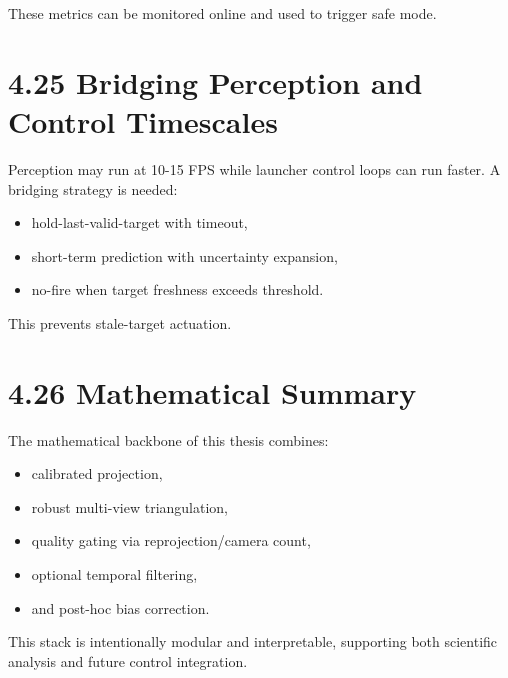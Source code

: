 These metrics can be monitored online and used to trigger safe mode.

\section{4.25 Bridging Perception and Control Timescales}
Perception may run at 10-15 FPS while launcher control loops can run faster. A bridging strategy is needed:
\begin{itemize}
  \item hold-last-valid-target with timeout,
  \item short-term prediction with uncertainty expansion,
  \item no-fire when target freshness exceeds threshold.
\end{itemize}

This prevents stale-target actuation.

\section{4.26 Mathematical Summary}
The mathematical backbone of this thesis combines:
\begin{itemize}
  \item calibrated projection,
  \item robust multi-view triangulation,
  \item quality gating via reprojection/camera count,
  \item optional temporal filtering,
  \item and post-hoc bias correction.
\end{itemize}

This stack is intentionally modular and interpretable, supporting both scientific analysis and future control integration.
